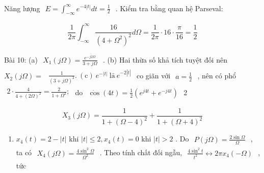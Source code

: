 \documentclass[
  10
]{article}
\providecommand{\tightlist}{%
  \setlength{\itemsep}{0pt}\setlength{\parskip}{0pt}}
\begin{document}
Năng lượng
\(\begin{array} { r } { E = \int _ { - \infty } ^ { \infty } e ^ { - 4 | t | } d t = \frac 1 2 } \end{array}\)
. Kiểm tra bằng quan hệ Parseval:

\[
\frac {1}{2 \pi} \int_ {- \infty} ^ {\infty} \frac {1 6}{(4 + \Omega^ {2}) ^ {2}} d \Omega = \frac {1}{2 \pi} \cdot 1 6 \cdot \frac {\pi}{1 6} = \frac {1}{2}
\]

Bài 10: (a)
\(\begin{array} { r } { X _ { 1 } ( j \Omega ) = \frac { e ^ { - j 2 \Omega } } { 3 + j \Omega } } \end{array}\)
. (b) Hai thừa số khả tích tuyệt đối nên \(X _ { 2 } ( j \Omega ) =\)
\(\begin{array} { r } { \frac { 1 } { ( 3 + j \Omega ) ^ { 2 } } . ~ ( \mathrm { c } ) ~ e ^ { - | t | } ~ \operatorname { l \bar { a } } ~ e ^ { - 2 | \dot { t } | } } \end{array}\)
co giãn với
\(\begin{array} { r } { a = \frac { 1 } { 2 } } \end{array}\) , nên có
phổ
\(\begin{array} { r } { 2 \cdot \frac { 4 } { 4 + ( 2 \Omega ) ^ { 2 } } = \frac { 2 } { 1 + \Omega ^ { 2 } } ; } \end{array}\)
do
\(\begin{array} { r } { \dot { \cos } ( 4 t ) = \frac { 1 } { 2 } ( e ^ { j 4 t } + e ^ { - j 4 t } ) } \end{array}\)
2

\[
X _ {3} (j \Omega) = \frac {1}{1 + (\Omega - 4) ^ {2}} + \frac {1}{1 + (\Omega + 4) ^ {2}}
\]

\begin{enumerate}
\def\labelenumi{(\alph{enumi})}
\setcounter{enumi}{3}
\tightlist
\item
  \(x _ { 4 } ( t ) = 2 - | t |\) khi
  \(| t | \leq 2 , x _ { 4 } ( t ) = 0\) khi \(| t | > 2\) . Do
  \(\begin{array} { r } { P ( j \Omega ) = \frac { 2 \sin \Omega } { \Omega } } \end{array}\)
  , ta có
  \(\begin{array} { r } { X _ { 4 } ( j \Omega ) = \frac { 4 \sin ^ { 2 } \Omega } { \Omega ^ { 2 } } } \end{array}\)
  . Theo tính chất đối ngẫu,
  \(\begin{array} { r } { \frac { 4 \sin ^ { 2 } t } { t ^ { 2 } } \longleftrightarrow 2 \pi x _ { 4 } ( - \Omega ) } \end{array}\)
  , tức
\end{enumerate}
\end{document}
